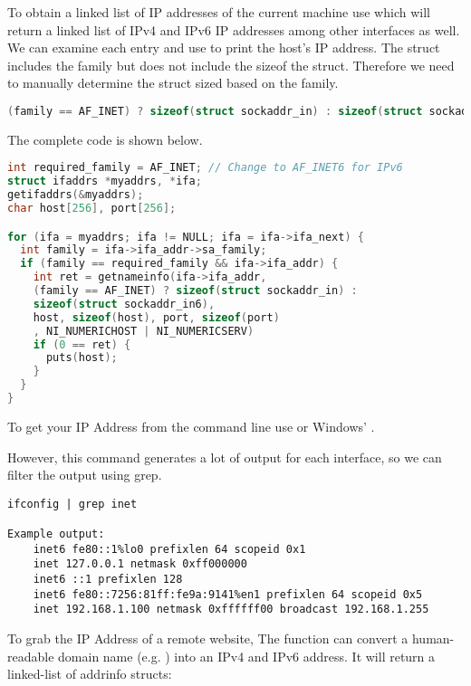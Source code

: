 To obtain a linked list of IP addresses of the current machine use  which will return a linked list of IPv4 and IPv6 IP addresses among other interfaces as well.
We can examine each entry and use  to print the host's IP address.
The  struct includes the family but does not include the sizeof the struct.
Therefore we need to manually determine the struct sized based on the family.

\begin{lstlisting}[language=C]
(family == AF_INET) ? sizeof(struct sockaddr_in) : sizeof(struct sockaddr_in6)
\end{lstlisting}

The complete code is shown below.

\begin{lstlisting}[language=C]
int required_family = AF_INET; // Change to AF_INET6 for IPv6
struct ifaddrs *myaddrs, *ifa;
getifaddrs(&myaddrs);
char host[256], port[256];

for (ifa = myaddrs; ifa != NULL; ifa = ifa->ifa_next) {
  int family = ifa->ifa_addr->sa_family;
  if (family == required_family && ifa->ifa_addr) {
    int ret = getnameinfo(ifa->ifa_addr,
    (family == AF_INET) ? sizeof(struct sockaddr_in) :
    sizeof(struct sockaddr_in6),
    host, sizeof(host), port, sizeof(port)
    , NI_NUMERICHOST | NI_NUMERICSERV)
    if (0 == ret) {
      puts(host);
    }
  }
}
\end{lstlisting}

To get your IP Address from the command line use  or Windows' .

However, this command generates a lot of output for each interface, so we can filter the output using grep.

\begin{lstlisting}
ifconfig | grep inet

Example output:
    inet6 fe80::1%lo0 prefixlen 64 scopeid 0x1
    inet 127.0.0.1 netmask 0xff000000
    inet6 ::1 prefixlen 128
    inet6 fe80::7256:81ff:fe9a:9141%en1 prefixlen 64 scopeid 0x5
    inet 192.168.1.100 netmask 0xffffff00 broadcast 192.168.1.255
\end{lstlisting}

To grab the IP Address of a remote website, The function  can convert a human-readable domain name (e.g. ) into an IPv4 and IPv6 address.
It will return a linked-list of addrinfo structs:

